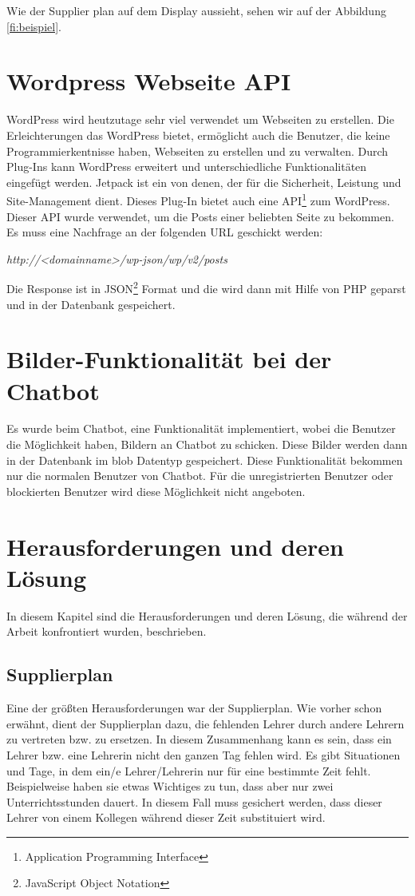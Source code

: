 Wie der Supplier plan auf dem Display aussieht, sehen wir auf der Abbildung \ref{fi:beispiel}.

\section{Wordpress Webseite API}


WordPress wird heutzutage sehr viel verwendet um Webseiten zu erstellen. Die Erleichterungen das WordPress bietet, ermöglicht auch die Benutzer, die keine Programmierkentnisse haben, Webseiten zu erstellen und zu verwalten. Durch Plug-Ins kann WordPress erweitert und unterschiedliche Funktionalitäten eingefügt werden. Jetpack ist ein von denen, der für die Sicherheit, Leistung und Site-Management dient. Dieses Plug-In bietet auch eine API\footnote{Application Programming Interface} zum WordPress. Dieser API wurde verwendet, um die Posts einer beliebten Seite zu bekommen. Es muss eine Nachfrage an der folgenden URL geschickt werden:


\begin{center}
	\textit{http://\textless{}\textit{domainname}\textgreater{}/wp-json/wp/v2/posts}
	
\end{center}


Die Response ist in JSON\footnote{JavaScript Object Notation} Format und die wird dann mit Hilfe von PHP geparst und in der Datenbank gespeichert. 

\section{Bilder-Funktionalität bei der Chatbot}
Es wurde beim Chatbot, eine Funktionalität implementiert, wobei die Benutzer die Möglichkeit haben, Bildern an Chatbot zu schicken. Diese Bilder werden dann in der Datenbank im blob Datentyp gespeichert. Diese Funktionalität bekommen nur die normalen Benutzer von Chatbot. Für die unregistrierten Benutzer oder blockierten Benutzer wird diese Möglichkeit nicht angeboten.

\section{Herausforderungen und deren Lösung}

In diesem Kapitel sind die Herausforderungen und deren Lösung, die während der Arbeit konfrontiert wurden, beschrieben.

\subsection{Supplierplan}
Eine der größten Herausforderungen war der Supplierplan. Wie vorher schon erwähnt, dient der Supplierplan dazu, die fehlenden Lehrer durch andere Lehrern zu vertreten bzw. zu ersetzen. In diesem Zusammenhang kann es sein, dass ein Lehrer bzw. eine Lehrerin nicht den ganzen Tag fehlen wird. Es gibt Situationen und Tage, in dem ein/e Lehrer/Lehrerin nur für eine bestimmte Zeit fehlt. Beispielweise haben sie etwas Wichtiges zu tun, dass aber nur zwei Unterrichtsstunden dauert. In diesem Fall muss gesichert werden, dass dieser Lehrer von einem Kollegen während dieser Zeit substituiert wird.


